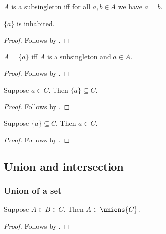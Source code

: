 \begin{abbreviation}\label{subsingleton}
    $A$ is a subsingleton iff for all $a, b\in A$ we have $a = b$.
\end{abbreviation}

\begin{proposition}\label{singleton_inhabited}
    $\{a\}$ is inhabited.
\end{proposition}
\begin{proof}
    Follows by .
\end{proof}

\begin{proposition}\label{singleton_iff_inhabited_subsingleton}
    $A = \{a\}$ iff $A$ is a subsingleton and $a\in A$.
\end{proposition}
\begin{proof}
    Follows by .
\end{proof}

\begin{classification}\label{singleton_subset_intro}
    Suppose $a\in C$.
    Then $\{a\}\subseteq C$.
\end{classification}
\begin{proof}
    Follows by .
\end{proof}

\begin{proposition}\label{singleton_subset_elim}
    Suppose $\{a\}\subseteq C$.
    Then $a\in C$.
\end{proposition}
\begin{proof}
    Follows by .
\end{proof}


\subsection{Union and intersection}

\subsubsection{Union of a set}

\begin{proposition}%
\label{unions_intro}
    Suppose $A\in B\in C$.
    Then $A\in\unions{C}$.
\end{proposition}
\begin{proof}
    Follows by .
\end{proof}

